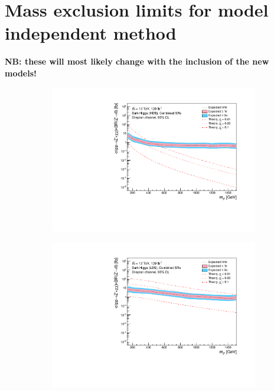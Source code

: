 \documentclass[12pt, a4paper]{book}
\begin{document}
\section{Mass exclusion limits for model independent method}\label{fig:model_indep_exclusions}
\textbf{NB: these will most likely change with the inclusion of the new models!}
\begin{figure}[!ht]
	\centering
	\begin{subfigure}[b]{0.49\textwidth}
      \centering
      \includegraphics[width=1\textwidth]{Limits/Model_independent/DH_HDS/mass_exclusion_comb.pdf}
   \end{subfigure}
   \hfill
   \begin{subfigure}[b]{0.49\textwidth}
      \centering
      \includegraphics[width=1\textwidth]{Limits/Model_independent/DH_LDS/mass_exclusion_comb.pdf}

\end{subfigure}
\end{figure}
\end{document}
